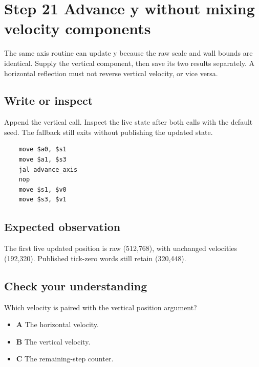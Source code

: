 \section{Step 21 Advance y without mixing velocity components}\label{ball-s21}

The same axis routine can update y because the raw scale and wall bounds are identical. Supply the vertical component, then save its two results separately. A horizontal reflection must not reverse vertical velocity, or vice versa.

\subsection{Write or inspect}
Append the vertical call. Inspect the live state after both calls with the default seed. The fallback still exits without publishing the updated state.

\begin{verbatim}
    move $a0, $s1
    move $a1, $s3
    jal advance_axis
    nop
    move $s1, $v0
    move $s3, $v1
\end{verbatim}

\subsection{Expected observation}
The first live updated position is raw (512,768), with unchanged velocities (192,320). Published tick-zero words still retain (320,448).

\subsection{Check your understanding}
Which velocity is paired with the vertical position argument?

\begin{itemize}
  \item \textbf{A} The horizontal velocity.
  \item \textbf{B} The vertical velocity.
  \item \textbf{C} The remaining-step counter.
\end{itemize}
